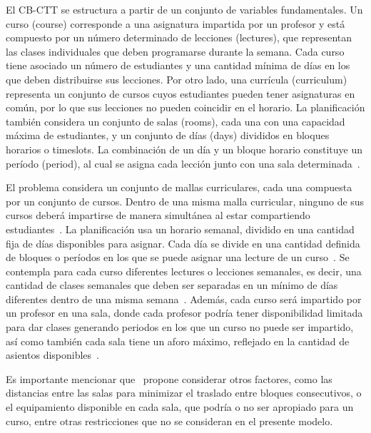 \documentclass[letter, 10pt]{article}
\begin{document}
El CB-CTT se estructura a partir de un conjunto de variables fundamentales. Un curso (course) corresponde a una asignatura impartida por un profesor y est\'a compuesto por un n\'umero determinado de lecciones (lectures), que representan las clases individuales que deben programarse durante la semana. Cada curso tiene asociado un n\'umero de estudiantes y una cantidad m\'inima de d\'ias en los que deben distribuirse sus lecciones. Por otro lado, una curr\'icula (curriculum) representa un conjunto de cursos cuyos estudiantes pueden tener asignaturas en com\'un, por lo que sus lecciones no pueden coincidir en el horario. La planificaci\'on tambi\'en considera un conjunto de salas (rooms), cada una con una capacidad m\'axima de estudiantes, y un conjunto de d\'ias (days) divididos en bloques horarios o timeslots. La combinaci\'on de un d\'ia y un bloque horario constituye un per\'iodo (period), al cual se asigna cada lecci\'on junto con una sala determinada~\cite{Bonutti2012Benchmarking}.

El problema considera un conjunto de mallas curriculares, cada una compuesta por un conjunto de cursos. Dentro de una misma malla curricular, ninguno de sus cursos deber\'a impartirse de manera simult\'anea al estar compartiendo estudiantes~\cite{Bonutti2012Benchmarking,DiGaspero2007ITC}. La planificaci\'on usa un horario semanal, dividido en una cantidad fija de d\'ias disponibles para asignar. Cada d\'ia se divide en una cantidad definida de bloques o per\'iodos en los que se puede asignar una lecture de un curso~\cite{Bonutti2012Benchmarking,DiGaspero2007ITC}. Se contempla para cada curso diferentes lectures o lecciones semanales, es decir, una cantidad de clases semanales que deben ser separadas en un m\'inimo de d\'ias diferentes dentro de una misma semana~\cite{Bonutti2012Benchmarking,DiGaspero2007ITC}. Adem\'as, cada curso ser\'a impartido por un profesor en una sala, donde cada profesor podr\'ia tener disponibilidad limitada para dar clases generando periodos en los que un curso no puede ser impartido, as\'i como tambi\'en  cada sala tiene un aforo m\'aximo, reflejado en la cantidad de asientos disponibles~\cite{Bonutti2012Benchmarking,DiGaspero2007ITC}.

Es importante mencionar que~\cite{Bonutti2012Benchmarking} propone considerar otros factores, como las distancias entre las salas para minimizar el traslado entre bloques consecutivos, o el equipamiento disponible en cada sala, que podr\'ia o no ser apropiado para un curso, entre otras restricciones que no se consideran en el presente modelo.
\end{document}
